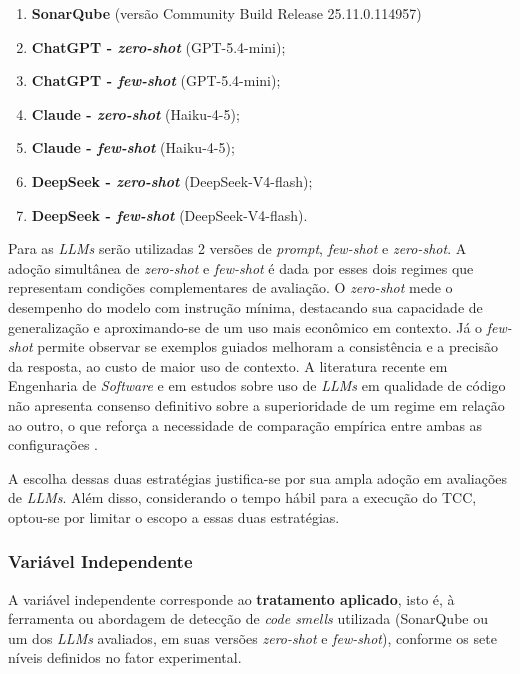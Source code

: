 \begin{enumerate}
    \item \textbf{SonarQube} (versão Community Build Release 25.11.0.114957)
    \item \textbf{ChatGPT - \textit{zero-shot}} (GPT-5.4-mini);
    \item \textbf{ChatGPT - \textit{few-shot}} (GPT-5.4-mini);
    \item \textbf{Claude - \textit{zero-shot}} (Haiku-4-5);
    \item \textbf{Claude - \textit{few-shot}} (Haiku-4-5);
    \item \textbf{DeepSeek - \textit{zero-shot}} (DeepSeek-V4-flash);
    \item \textbf{DeepSeek - \textit{few-shot}} (DeepSeek-V4-flash).
\end{enumerate}

        Para as \textit{LLMs} serão utilizadas 2 versões de \textit{prompt}, \textit{few-shot} e \textit{zero-shot}. A adoção simultânea de \textit{zero-shot} e \textit{few-shot} é dada por esses dois regimes que representam condições complementares de avaliação. O \textit{zero-shot} mede o desempenho do modelo com instrução mínima, destacando sua capacidade de generalização e aproximando-se de um uso mais econômico em contexto. Já o \textit{few-shot} permite observar se exemplos guiados melhoram a consistência e a precisão da resposta, ao custo de maior uso de contexto. A literatura recente em Engenharia de \textit{Software} e em estudos sobre uso de \textit{LLMs} em qualidade de código não apresenta consenso definitivo sobre a superioridade de um regime em relação ao outro, o que reforça a necessidade de comparação empírica entre ambas as configurações \cite{Babikian2025StringValues,Bommasani2021,Abtahi2025LLMStaticAnalysis,DellaPortaEtAll,alomari2026}.

        A escolha dessas duas estratégias justifica-se por sua ampla adoção em avaliações de \textit{LLMs}.
    Além disso, considerando o tempo hábil para a execução do TCC, optou-se por limitar o escopo a essas duas estratégias. 


\subsubsection*{Variável Independente}
A variável independente corresponde ao \textbf{tratamento aplicado}, isto é, à ferramenta ou abordagem de detecção de \textit{code smells} utilizada (SonarQube ou um dos \textit{LLMs} avaliados, em suas versões \textit{zero-shot} e \textit{few-shot}), conforme os sete níveis definidos no fator experimental.

